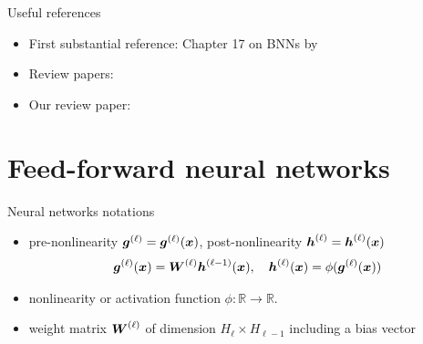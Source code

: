 \documentclass[9pt]{beamer}
\begin{document}
\begin{frame}{Useful references}
\begin{itemize}
	\item \alert{First substantial reference}: Chapter 17 on BNNs by 
	\item  \alert{Review papers}: \citet{jospin2020hands,abdar2021review,goan2020bayesian,fortuin2021priors,ashukha2020pitfalls,band2021benchmarking,nado2021uncertainty}
	\item \alert{Our review paper}: 
\end{itemize}
\end{frame}
	





\section{Feed-forward neural networks}

\begin{frame}{Neural networks notations}

\begin{figure}[ht!]
\begin{center}
\scalebox{.8}{

}
\end{center}
\label{figure:nn_visualization_intro}
\end{figure}

\begin{itemize}
	\item \alert{pre-nonlinearity} $\boldsymbol{g}^{(\ell)}=\boldsymbol{g}^{(\ell)}(\boldsymbol{x})$, \alert{post-nonlinearity}  $\boldsymbol{h}^{(\ell)}=\boldsymbol{h}^{(\ell)}(\boldsymbol{x})$
\begin{align*}\label{eq:propagation}
      \boldsymbol{g}^{(\ell)}(\boldsymbol{x}) = \boldsymbol{W}^{(\ell)} \boldsymbol{h}^{(\ell - 1)} (\boldsymbol{x}), \quad \boldsymbol{h}^{(\ell)} (\boldsymbol{x}) = \phi(\boldsymbol{g}^{(\ell)}(\boldsymbol{x}))
\end{align*}
	\item \alert{nonlinearity} or \alert{activation function}  $\phi: \mathbb{R} \to \mathbb{R}$.
	\item \alert{weight matrix} $\boldsymbol{W}^{(\ell)}$ of dimension $H_\ell\times H_{\ell-1}$ including a bias vector
\end{itemize}

\end{frame}
\end{document}
